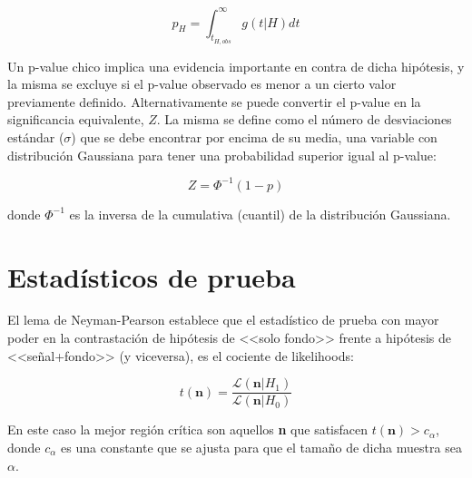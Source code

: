 \begin{equation}
	p_H = \int_{t_{H,obs}}^{\infty} g(t|H)dt
\end{equation}

Un p-value chico implica una evidencia importante en contra de dicha hipótesis, y la misma se excluye si el p-value observado es menor a un cierto valor previamente definido.  Alternativamente se puede convertir el p-value en la significancia equivalente, $Z$. La misma se define como el número de desviaciones estándar ($\sigma$) que se debe encontrar por encima de su media, una variable con distribución Gaussiana para tener una probabilidad superior igual al p-value:

\begin{equation}
	Z=\Phi^{-1}(1-p)
	\label{ec:sign}
\end{equation}

\noindent
donde $\Phi^{-1}$ es la inversa de la cumulativa (cuantil) de la distribución Gaussiana. 


\section{Estadísticos de prueba}


El lema de Neyman-Pearson \cite{10.2307/91247} establece que el estadístico de prueba con mayor poder en la contrastación de hipótesis de <<solo fondo>> frente a hipótesis de <<señal+fondo>> (y viceversa), es el cociente de likelihoods:


\begin{equation}
	t(\textbf{n}) = \frac{\mathcal{L}(\textbf{n}|H_1)}{\mathcal{L}(\textbf{n}|H_0)}
\end{equation}

En este caso la mejor región crítica son aquellos \textbf{n} que satisfacen $t(\textbf{n})>c_\alpha$, donde $c_\alpha$ es una constante que se ajusta para que el tamaño de dicha muestra sea $\alpha$.

